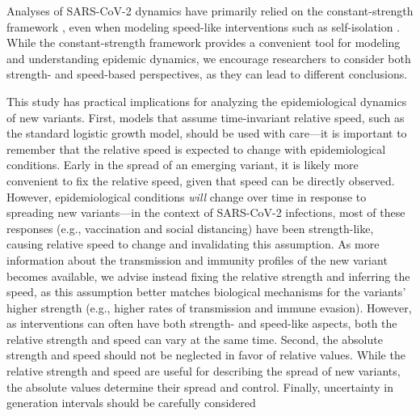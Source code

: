 \documentclass[12pt]{article}
\providecommand{\DIFaddtex}[1]{{\protect\color{blue}\uwave{#1}}} %
\providecommand{\DIFaddbegin}{} %
\providecommand{\DIFadd}[1]{\texorpdfstring{\DIFaddtex{#1}}{#1}} %
\newcommand{\DIFaddincludegraphics}[2][]{{\color{blue}\fbox{\DIFOincludegraphics[#1]{#2}}}} %
\DeclareRobustCommand{\DIFaddbegin}{\DIFOaddbegin \let\includegraphics\DIFaddincludegraphics} %
\begin{document}
Analyses of SARS-CoV-2 dynamics have primarily relied on the constant-strength framework \citep{gostic2020practical,unwin2020state,brauner2021inferring}, even when modeling speed-like interventions such as self-isolation \citep{flaxman2020Rt,brett2020transmission}.
While the constant-strength framework provides a convenient tool for modeling and understanding epidemic dynamics, we encourage researchers to consider both strength- and speed-based perspectives, as they can lead to different conclusions.

This study has practical implications for analyzing the epidemiological dynamics of new variants.
First, models that assume time-invariant relative speed, such as the standard logistic growth model, should be used with care---it is important to remember that the relative speed is expected to change with epidemiological conditions.
Early in the spread of an emerging variant, it is likely more convenient to fix the relative speed, given that speed can be directly observed.
However, epidemiological conditions \textit{will} change over time in response to spreading new variants---in the context of SARS-CoV-2 infections, most of these responses (e.g., vaccination and social distancing) have been strength-like, causing relative speed to change and invalidating this assumption.
As more information about the transmission and immunity profiles of the new variant becomes available, we advise instead fixing the relative strength and inferring the speed, as this assumption better matches biological mechanisms for the variants' higher strength (e.g., higher rates of transmission and immune evasion).
However, as interventions can often have both strength- and speed-like aspects, both the relative strength and speed can vary at the same time.
Second, the absolute strength and speed should not be neglected in favor of relative values.
While the relative strength and speed are useful for describing the spread of new variants, the absolute values determine their spread and control.
Finally, uncertainty in generation intervals should be carefully considered\DIFaddbegin \DIFadd{.
}
\end{document}
